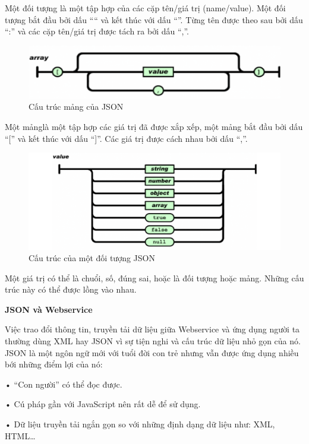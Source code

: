 Một đối tượng là một tập hợp của các cặp tên/giá trị (name/value). Một đối tượng bắt đầu bởi dấu “{“ và kết thúc với dấu “}”. Từng tên được theo sau bởi dấu “:” và các cặp tên/giá trị được tách ra bởi dấu “,”.

\begin{figure}[H]
	\centering    
	\includegraphics[width=1.0\textwidth]{json1}
	\caption[Cấu trúc mảng của JSON]{Cấu trúc mảng của JSON}
	\label{fig: json1}
\end{figure}

Một mảnglà một tập hợp các giá trị đã được xắp xếp, một mảng bắt đầu bởi dấu “[” và kết thúc với dấu “]”. Các giá trị được cách nhau bởi dấu “,”.
\begin{figure}[H]
	\centering    
	\includegraphics[width=1.0\textwidth]{json2}
	\caption[Cấu trúc của một đối tượng JSON]{Cấu trúc của một đối tượng JSON}
	\label{fig: json2}
\end{figure}

Một giá trị có thể là chuổi, số, đúng sai, hoặc là đối tượng hoặc mảng. Những cấu trúc này có thể được lồng vào nhau.

\textbf{JSON và Webservice}

Việc trao đổi thông tin, truyền tải dữ liệu giữa Webservice và ứng dụng người ta thường dùng XML hay JSON vì sự tiện nghi và cấu trúc dữ liệu nhỏ gọn của nó. JSON là một ngôn ngữ mới với tuổi đời con trẻ nhưng vẫn được ứng dụng nhiều bới những điểm lợi của nó:

• “Con người” có thể đọc được.

• Cú pháp gần với JavaScript nên rất dễ để sử dụng.

• Dữ liệu truyền tải ngắn gọn so với những định dạng dữ liệu như: XML, HTML…

